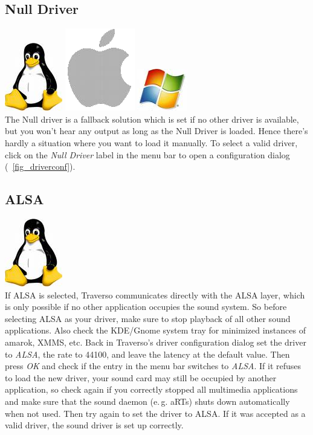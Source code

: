\subsection{Null Driver}
\includegraphics[height=\baselineskip]{../images/tux.png}
\includegraphics[height=\baselineskip]{../images/mac.png}
\includegraphics[height=\baselineskip]{../images/win.png}
\\
The Null driver is a fallback solution which is set if no other driver is available, but you won't hear any output as long as the Null Driver is loaded. Hence there's hardly a situation where you want to load it manually. To select a valid driver, click on the \emph{Null Driver} label in the menu bar to open a configuration dialog (\FigB\ \ref{fig_driverconf}).

\subsection{ALSA}
\includegraphics[height=\baselineskip]{../images/tux.png}
\\
If ALSA is selected, Traverso communicates directly with the ALSA layer, which is only possible if no other application occupies the sound system. So before selecting ALSA as your driver, make sure to stop playback of all other sound applications. Also check the KDE/Gnome system tray for minimized instances of amarok, XMMS, etc. Back in Traverso's driver configuration dialog set the driver to \emph{ALSA}, the rate to 44100, and leave the latency at the default value. Then press \emph{OK} and check if the entry in the menu bar switches to \emph{ALSA}. If it refuses to load the new driver, your sound card may still be occupied by another application, so check again if you correctly stopped all multimedia applications and make sure that the sound daemon (e.\,g. aRTs) shuts down automatically when not used. Then try again to set the driver to ALSA. If it was accepted as a valid driver, the sound driver is set up correctly.

